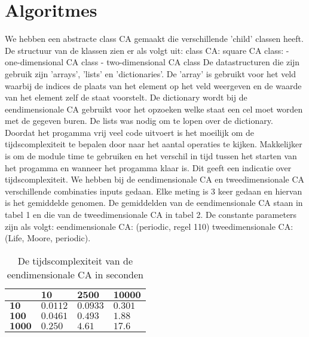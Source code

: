 \documentclass[12pt,a4paper]{article}
\begin{document}
\section*{Algoritmes}
We hebben een abstracte class CA gemaakt die verschillende 'child' classen heeft.
\newline
De structuur van de klassen zien er als volgt uit:
\newline
\phantom{.}class CA:
\newline
\phantom{.}\hspace{12pt}square CA class:
\newline
\phantom{.}\hspace{24pt}- one-dimensional CA class
\newline
\phantom{.}\hspace{24pt}- two-dimensional CA class
\vspace{6pt}
\newline
De datastructuren die zijn gebruik zijn 'arrays', 'lists' en 'dictionaries'. 
De 'array' is gebruikt voor het veld waarbij de indices de plaats van het element op het veld weergeven en 
de waarde van het element zelf de staat voorstelt.
De dictionary wordt bij de eendimensionale CA gebruikt voor het opzoeken welke staat een cel moet worden met de gegeven buren.
De lists was nodig om te lopen over de dictionary.
\newline
Doordat het progamma vrij veel code uitvoert is het moeilijk om 
de tijdscomplexiteit te bepalen door naar het aantal operaties te kijken.
Makkelijker is om de module time te gebruiken en het verschil in tijd tussen het starten van het progamma en wanneer het progamma klaar is.
Dit geeft een indicatie over tijdscomplexiteit.  
We hebben bij de eendimensionale CA en tweedimensionale CA verschillende combinaties 
inputs gedaan. Elke meting is 3 keer gedaan en hiervan is het gemiddelde genomen.
De gemiddelden van de eendimensionale CA staan in tabel 1 en die 
van de tweedimensionale CA in tabel 2. De constante parameters zijn als volgt:
\newline
eendimensionale CA: (periodic, regel 110)
\newline
tweedimensionale CA: (Life, Moore, periodic).

\begin{table*}
    \centering
    \begin{tabular}{|m{1.2cm}|m{2.0cm}|m{2.0cm}|m{2.0cm}|}
        \hline
        $\phantom{.}$ & $\textbf{10}$ & $\textbf{2500}$ & $\textbf{10000}$ \\
        \hline
        $\textbf{10}$ & $0.0112$ & $0.0933$ & $0.301$ \\
        \hline
        $\textbf{100}$ & $0.0461$ & $0.493$ & $1.88$ \\
        \hline
        $\textbf{1000}$ & $0.250$ & $4.61$ & $17.6$ \\
        \hline
    \end{tabular}
    \caption{De tijdscomplexiteit van de eendimensionale CA in seconden}
    \label{tbl:1dim}
\end{table*}
\end{document}
